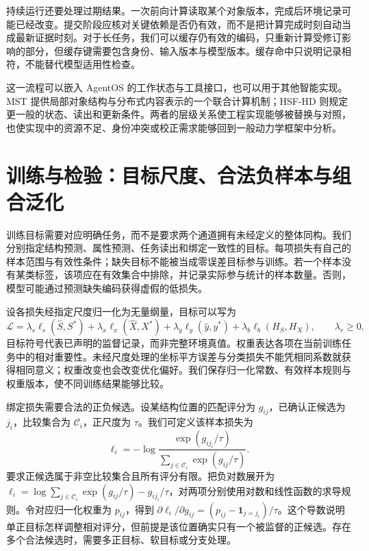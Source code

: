 持续运行还要处理过期结果。一次前向计算读取某个对象版本，完成后环境记录可能已经改变。提交阶段应核对关键依赖是否仍有效，而不是把计算完成时刻自动当成最新证据时刻。对于长任务，我们可以缓存仍有效的编码，只重新计算受修订影响的部分，但缓存键需要包含身份、输入版本与模型版本。缓存命中只说明记录相符，不能替代模型适用性检查。

这一流程可以嵌入 AgentOS 的工作状态与工具接口，也可以用于其他智能实现。MST 提供局部对象结构与分布式内容表示的一个联合计算机制；HSF-HD 则规定更一般的状态、读出和更新条件。两者的层级关系使工程实现能够被替换与对照，也使实现中的资源不足、身份冲突或校正需求能够回到一般动力学框架中分析。

\section{训练与检验：目标尺度、合法负样本与组合泛化}
\label{sec:training_paradigm}

训练目标需要对应明确任务，而不是要求两个通道拥有未经定义的整体同构。我们分别指定结构预测、属性预测、任务读出和绑定一致性的目标。每项损失有自己的样本范围与有效性条件；缺失目标不能被当成零误差目标参与训练。若一个样本没有某类标签，该项应在有效集合中排除，并记录实际参与统计的样本数量。否则，模型可能通过预测缺失编码获得虚假的低损失。

设各损失经指定尺度归一化为无量纲量，目标可以写为
\begin{equation}
\mathcal L=\lambda_s\ell_s(\widehat S,S^*)+
\lambda_x\ell_x(\widehat X,X^*)+
\lambda_y\ell_y(\widehat y,y^*)+
\lambda_b\ell_b(H_S,H_X),\qquad \lambda_r\geq0.
\end{equation}
目标符号代表已声明的监督记录，而非完整环境真值。权重表达各项在当前训练任务中的相对重要性。未经尺度处理的坐标平方误差与分类损失不能凭相同系数就获得相同意义；权重改变也会改变优化偏好。我们保存归一化常数、有效样本规则与权重版本，使不同训练结果能够比较。

绑定损失需要合法的正负候选。设某结构位置的匹配评分为 $g_{ij}$，已确认正候选为 $j_i$，比较集合为 $\mathcal C_i$，正尺度为 $\tau$。我们可定义该样本损失为
\begin{equation}
\ell_i=-\log\frac{\exp(g_{i j_i}/\tau)}{
\sum_{j\in\mathcal C_i}\exp(g_{ij}/\tau)}.
\end{equation}
要求正候选属于非空比较集合且所有评分有限。把负对数展开为 $\ell_i=\log\sum_{j\in\mathcal C_i}\exp(g_{ij}/\tau)-g_{i j_i}/\tau$，对两项分别使用对数和线性函数的求导规则。令对应归一化权重为 $p_{ij}$，得到 $\partial\ell_i/\partial g_{ij}=(p_{ij}-\mathbf1_{j=j_i})/\tau$。这个导数说明单正目标怎样调整相对评分，但前提是该位置确实只有一个被监督的正候选。存在多个合法候选时，需要多正目标、软目标或分支处理。

